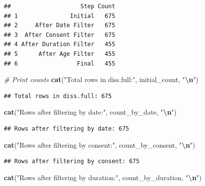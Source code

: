 \documentclass[
]{article}
\newenvironment{Shaded}{\begin{snugshade}}{\end{snugshade}}
\newcommand{\CommentTok}[1]{\textcolor[rgb]{0.56,0.35,0.01}{\textit{#1}}}
\newcommand{\FunctionTok}[1]{\textcolor[rgb]{0.13,0.29,0.53}{\textbf{#1}}}
\newcommand{\NormalTok}[1]{#1}
\newcommand{\SpecialCharTok}[1]{\textcolor[rgb]{0.81,0.36,0.00}{\textbf{#1}}}
\newcommand{\StringTok}[1]{\textcolor[rgb]{0.31,0.60,0.02}{#1}}
\begin{document}
\begin{verbatim}
##                    Step Count
## 1               Initial   675
## 2     After Date Filter   675
## 3  After Consent Filter   675
## 4 After Duration Filter   455
## 5      After Age Filter   455
## 6                 Final   455
\end{verbatim}

\begin{Shaded}
\begin{Highlighting}[]
\CommentTok{\# Print counts}
\FunctionTok{cat}\NormalTok{(}\StringTok{"Total rows in diss.full:"}\NormalTok{, initial\_count, }\StringTok{"}\SpecialCharTok{\textbackslash{}n}\StringTok{"}\NormalTok{)}
\end{Highlighting}
\end{Shaded}

\begin{verbatim}
## Total rows in diss.full: 675
\end{verbatim}

\begin{Shaded}
\begin{Highlighting}[]
\FunctionTok{cat}\NormalTok{(}\StringTok{"Rows after filtering by date:"}\NormalTok{, count\_by\_date, }\StringTok{"}\SpecialCharTok{\textbackslash{}n}\StringTok{"}\NormalTok{)}
\end{Highlighting}
\end{Shaded}

\begin{verbatim}
## Rows after filtering by date: 675
\end{verbatim}

\begin{Shaded}
\begin{Highlighting}[]
\FunctionTok{cat}\NormalTok{(}\StringTok{"Rows after filtering by consent:"}\NormalTok{, count\_by\_consent, }\StringTok{"}\SpecialCharTok{\textbackslash{}n}\StringTok{"}\NormalTok{)}
\end{Highlighting}
\end{Shaded}

\begin{verbatim}
## Rows after filtering by consent: 675
\end{verbatim}

\begin{Shaded}
\begin{Highlighting}[]
\FunctionTok{cat}\NormalTok{(}\StringTok{"Rows after filtering by duration:"}\NormalTok{, count\_by\_duration, }\StringTok{"}\SpecialCharTok{\textbackslash{}n}\StringTok{"}\NormalTok{)}
\end{Highlighting}
\end{Shaded}
\end{document}
